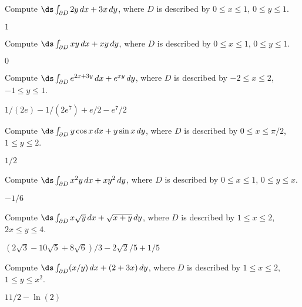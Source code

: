 \begin{exercises}

\begin{exercise} Compute $\ds\int_{\partial D} 2y\,dx + 3x\,dy$, 
where $D$ is described by $0\le x\le1$, $0\le y\le 1$.
\begin{answer} $1$
\end{answer}\end{exercise}

\begin{exercise} Compute $\ds\int_{\partial D} xy\,dx + xy\,dy$, 
where $D$ is described by $0\le x\le1$, $0\le y\le 1$.
\begin{answer} $0$
\end{answer}\end{exercise}

\begin{exercise} Compute $\ds\int_{\partial D} e^{2x+3y}\,dx + e^{xy}\,dy$, 
where $D$ is described by $-2\le x\le 2$, $-1\le y\le 1$.
\begin{answer} $1/(2e)-1/(2e^7)+e/2-e^7/2$
\end{answer}\end{exercise}

\begin{exercise} Compute $\ds\int_{\partial D} y\cos x\,dx + y\sin x\,dy$, 
where $D$ is described by $0\le x\le \pi/2$, $1\le y\le 2$.
\begin{answer} $1/2$
\end{answer}\end{exercise}

\begin{exercise} Compute $\ds\int_{\partial D} x^2y\,dx + xy^2\,dy$, 
where $D$ is described by $0\le x\le 1$, $0\le y\le x$.
\begin{answer} $-1/6$
\end{answer}\end{exercise}

\begin{exercise} Compute $\ds\int_{\partial D} x\sqrt{y}\,dx + \sqrt{x+y}\,dy$, 
where $D$ is described by $1\le x\le 2$, $2x\le y\le 4$.
\begin{answer} $(2\sqrt3-10\sqrt5+8\sqrt6)/3-2\sqrt2/5+1/5$
\end{answer}\end{exercise}

\begin{exercise} Compute $\ds\int_{\partial D} (x/y)\,dx + (2+3x)\,dy$, 
where $D$ is described by $1\le x\le 2$, $1\le y\le x^2$.
\begin{answer} $11/2-\ln(2)$
\end{answer}\end{exercise}


\end{exercises}
